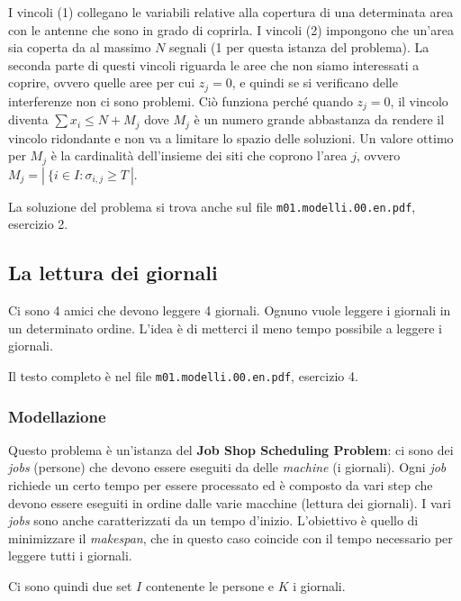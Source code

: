 \noindent I vincoli (1) collegano le variabili relative alla copertura di una determinata area con le antenne che sono in grado di coprirla.
I vincoli (2) impongono che un'area sia coperta da al massimo $N$ segnali (1 per questa istanza del problema). 
La seconda parte di questi vincoli riguarda le aree che non siamo interessati a coprire, ovvero quelle aree per cui $z_j = 0$, e quindi se si verificano delle interferenze non ci sono problemi. Ciò funziona perché quando $z_j = 0$, il vincolo diventa $\sum x_i\leq N+M_j$ dove $M_j$ è un numero grande abbastanza da rendere il vincolo ridondante e non va a limitare lo spazio delle soluzioni.
Un valore ottimo per $M_j$ è la cardinalità dell'insieme dei siti che coprono l'area $j$, ovvero $M_j = | \: \{i \in I : \sigma_{i,j} \geq T \: |$.

La soluzione del problema si trova anche sul file \texttt{m01.modelli.00.en.pdf}, esercizio 2.

\subsection{La lettura dei giornali}

Ci sono 4 amici che devono leggere 4 giornali. Ognuno vuole leggere i giornali in un determinato ordine. L'idea è di metterci il meno tempo possibile a leggere i giornali.

Il testo completo è nel file \texttt{m01.modelli.00.en.pdf}, esercizio 4.

\subsubsection{Modellazione}

Questo problema è un'istanza del \textbf{Job Shop Scheduling Problem}: ci sono dei \textit{jobs} (persone) che devono essere eseguiti da delle \textit{machine} (i giornali). Ogni \textit{job} richiede un certo tempo per essere processato ed è composto da vari step che devono essere eseguiti in ordine dalle varie macchine (lettura dei giornali). I vari \textit{jobs} sono anche caratterizzati da un tempo d'inizio.
L'obiettivo è quello di minimizzare il \textit{makespan}, che in questo caso coincide con il tempo necessario per leggere tutti i giornali. 

Ci sono quindi due set $I$ contenente le persone e $K$ i giornali.


